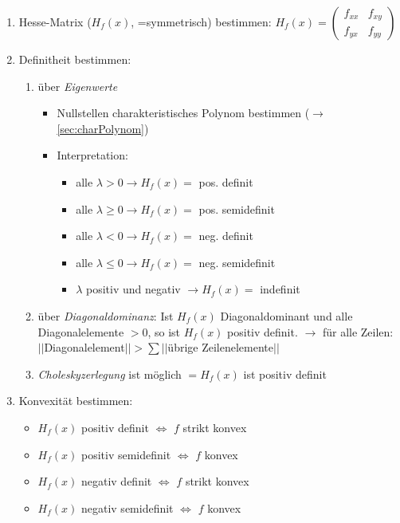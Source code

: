 \begin{enumerate}
    \item Hesse-Matrix (\(H_f(x)\), =symmetrisch) bestimmen:
            \(H_f(x) =
                \begin{pmatrix}
                    f_{xx} & f_{xy} \\
                    f_{yx} & f_{yy}
                \end{pmatrix}
            \)
    \item Definitheit bestimmen:
        \begin{enumerate}
            \item über \emph{Eigenwerte}
                \begin{itemize}
                    \item Nullstellen charakteristisches Polynom bestimmen (\(\rightarrow \) \ref{sec:charPolynom})
                    \item Interpretation:
                    \begin{itemize}
                        \item alle \(\lambda>0\rightarrow H_f(x)=\) pos. definit
                        \item alle \(\lambda\geq 0\rightarrow H_f(x)=\) pos. semidefinit 
                        \item alle \(\lambda<0\rightarrow H_f(x)=\) neg. definit 
                        \item alle \(\lambda\leq 0\rightarrow H_f(x)=\) neg. semidefinit 
                        \item \(\lambda\) positiv und negativ \(\rightarrow H_f(x)=\) indefinit
                    \end{itemize}
                \end{itemize}
            \item über \emph{Diagonaldominanz}: Ist \(H_f(x)\) Diagonaldominant und alle Diagonalelemente \(>0\), so ist \(H_f(x)\) positiv definit. \(\rightarrow \) für alle Zeilen: \(||\)Diagonalelement\(|| > \sum ||\)übrige Zeilenelemente\(||\) 
            \item \emph{Choleskyzerlegung} ist möglich \(= H_f(x)\) ist positiv definit
        \end{enumerate}
    \item Konvexität bestimmen:
        \begin{itemize}
            \item \(H_f(x)\) positiv definit \(\Leftrightarrow\) \(f\) strikt konvex
            \item \(H_f(x)\) positiv semidefinit \(\Leftrightarrow\) \(f\) konvex
            \item \(H_f(x)\) negativ definit \(\Leftrightarrow\) \(f\) strikt konvex
            \item \(H_f(x)\) negativ semidefinit \(\Leftrightarrow\) \(f\) konvex
        \end{itemize}
\end{enumerate}


